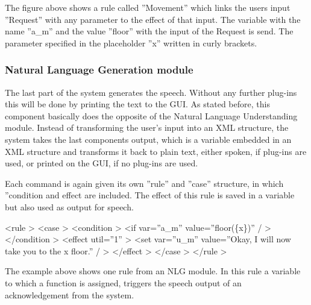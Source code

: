 The figure above shows  a rule called ”Movement” which links the users input ”Request” with any parameter to the effect of that input.
The variable with the name ”a\_m” and the value ”floor” with the input of the Request is send.
The parameter specified in the placeholder ”x” written in curly brackets.

\subsubsection{Natural Language Generation module}

The last part of the system generates the speech. 
Without any further plug-ins this will be done by printing the text to the GUI.
As stated before, this component basically does the opposite of the Natural Language Understanding module. 
Instead of transforming the user's input into an XML structure, the system takes the last components output, which is a variable embedded in an XML structure and transforms it back to plain text, either spoken, if plug-ins are used, or printed on the GUI, if no plug-ins are used. \newline

Each command is again given its own ”rule” and ”case” structure, in which ”condition and effect are included. 
The effect of this rule is saved in a variable but also used as output for speech. \newline

\textless rule \textgreater \newline
\indent \indent \textless case \textgreater \newline
\indent \indent \indent \textless condition \textgreater \newline 
\indent \indent \indent \indent \textless if var=”a\_m” value=”floor(\{x\})” / \textgreater \newline
\indent \indent \indent \textless /condition \textgreater \newline
\indent \indent \indent \textless effect util=”1” \textgreater \newline 
\indent \indent \indent \indent \textless set var=”u\_m” value=”Okay, I will now take you to the {x} floor.” / \textgreater \newline
\indent \indent \indent \textless /effect \textgreater \newline
\indent \indent\textless /case \textgreater \newline
\indent \textless /rule \textgreater \newline

The example above shows one rule from an NLG module. 
In this rule a variable to which a function  is assigned, triggers the speech output of an acknowledgement from the system.

